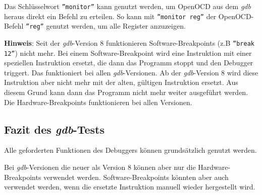 Das Schlüsselwort \texttt{''monitor''} kann genutzt werden, um OpenOCD aus dem \textit{gdb} heraus direkt ein Befehl zu erteilen.
So kann mit \texttt{''monitor reg''} der OpenOCD-Befehl \texttt{''reg''} genutzt werden, um alle Register anzuzeigen.

\textbf{Hinweis}: 
Seit der \textit{gdb}-Version 8 funktionieren Software-Breakpoints (z.B \texttt{''break 12''}) nicht mehr.
Bei einem Software-Breakpoint wird eine Instruktion mit einer speziellen Instruktion ersetzt, die dann das Programm stoppt und den Debugger triggert.
Das funktioniert bei allen \textit{gdb}-Versionen.
Ab der \textit{gdb}-Version 8 wird diese Instruktion aber nicht mehr mit der alten, gültigen Instruktion ersetzt.
Aus diesem Grund kann dann das Programm nicht mehr weiter ausgeführt werden.
Die Hardware-Breakpoints funktionieren bei allen Versionen.


\subsection{Fazit des \textit{gdb}-Tests}
Alle geforderten Funktionen des Debuggers können grundsätzlich genutzt werden.

Bei \textit{gdb}-Versionen die neuer als Version 8 können aber nur die Hardware-Breakpoints verwendet werden.
Software-Breakpoints könnten aber auch verwendet werden, wenn die ersetzte Instruktion manuell wieder hergestellt wird.



